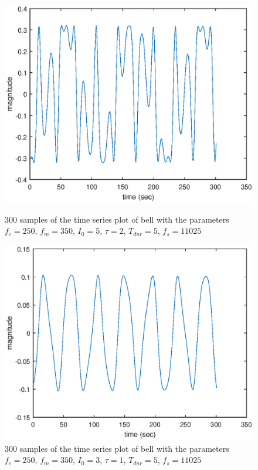 \documentclass{article}
\begin{document}
\begin{figure}[H]
	\centering
	\begin{minipage}{0.3\linewidth}
		\includegraphics[scale=0.3]{samp5}
		\caption{300 samples of the time series plot of bell with the parameters $f_c = 250$, $f_m = 350$, $I_0 = 5$, $\tau = 2$, $T_{dur} = 5$, $f_s = 11025$}
	\end{minipage}
	\hspace{4cm}
	\begin{minipage}{0.3\linewidth}
		\includegraphics[scale=0.3]{samp6}
		\caption{300 samples of the time series plot of bell with the parameters $f_c = 250$, $f_m = 350$, $I_0 = 3$, $\tau = 1$, $T_{dur} = 5$, $f_s = 11025$}
	\end{minipage}
\end{figure}
\end{document}
